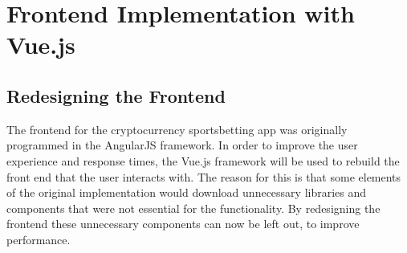 \chapter{Frontend Implementation with Vue.js}
\section{Redesigning the Frontend}
The frontend for the cryptocurrency sportsbetting app was originally programmed in the AngularJS framework. In order to improve the user experience and response times, the Vue.js framework will be used to rebuild the front end that the user interacts with. The reason for this is that some elements of the original implementation would download unnecessary libraries and components that were not essential for the functionality. By redesigning the frontend these unnecessary components can now be left out, to improve performance.